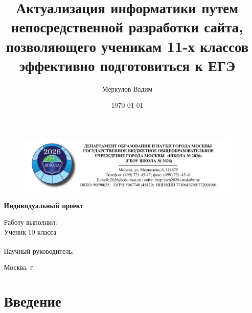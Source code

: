 \documentclass[a4paper, 12pt]{extarticle}
\title{Актуализация информатики путем непосредственной разработки сайта,
позволяющего ученикам 11-х классов эффективно подготовиться к ЕГЭ}
\author{Меркулов Вадим}
\date{\today}
\begin{document}
\begin{titlepage}
    \vspace*{0.7cm}
    \begin{center}
        \begin{figure}[h]
            \includegraphics{../img/title_page_school_logo.jpg}
        \end{figure}
        \vspace{1.5cm}

        \Large{\textbf{
            Индивидуальный проект \\
            \textquote{\thetitle}}
        }
    \end{center}
    \vspace{5cm}

    \begin{flushright}
        Работу выполнил:\\ \vspace{7pt}
        Ученик 10  класса\\ \vspace{7pt}
        \theauthor\\ \vspace{1cm}
        Научный руководитель:\\ \vspace{7pt}
    \end{flushright}
    \vfill
    \centering
    Москва, {\the\year} г.

\end{titlepage}

\tableofcontents
\newpage

\section{Введение}
\end{document}
